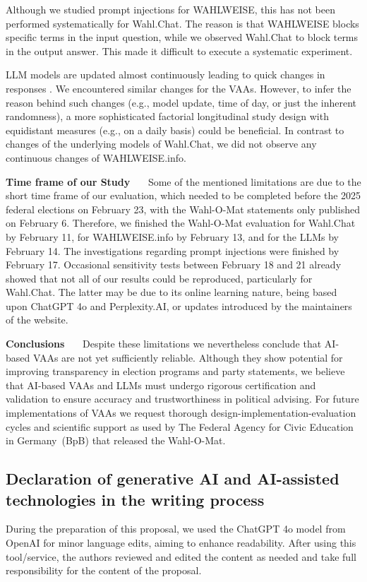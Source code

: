 \documentclass[
	fontsize=10pt,          %
	numbers=noenddot,    	%
    parskip=half,        	%
    listof=totoc,        	%
    bibliography=totoc,  	%
	headsepline=true,       %
	footsepline=false, 		%
    DIV=12                	%
]{scrartcl}
\begin{document}
Although we studied prompt injections for WAHLWEISE, this has not been performed systematically for Wahl.Chat. The reason is that WAHLWEISE blocks specific terms in the input question, while we observed Wahl.Chat to block terms in the output answer. This made it difficult to execute a systematic experiment.

LLM models are updated almost continuously leading to quick changes in responses \citep{lunardi2024elusiveness,liu2025turning}. We encountered similar changes for the VAAs. However, to infer the reason behind such changes (e.g., model update, time of day, or just the inherent randomness), a more sophisticated factorial longitudinal study design with equidistant measures (e.g., on a daily basis) could be beneficial. In contrast to changes of the underlying models of Wahl.Chat, we did not observe any continuous changes of WAHLWEISE.info.

\textbf{Time frame of our Study}~~~
Some of the mentioned limitations are due to the short time frame of our evaluation, which needed to be completed before the 2025 federal elections on February 23, with the Wahl-O-Mat statements only published on February 6. Therefore, we finished the 
Wahl-O-Mat evaluation for Wahl.Chat by February 11, for WAHLWEISE.info
by February 13, and for the LLMs by February 14. The investigations regarding prompt injections were finished by February 17. 
Occasional sensitivity tests between February 18 and 21 already showed that not all of our results could be reproduced, particularly for Wahl.Chat. The latter may be due to its online learning nature, being based upon ChatGPT 4o and Perplexity.AI, or updates introduced by the maintainers of the website. 

%
\textbf{Conclusions}~~~
Despite these limitations we nevertheless conclude that AI-based VAAs are not yet sufficiently reliable. Although they show potential for improving transparency in election programs and party statements, we believe that AI-based VAAs and LLMs must undergo rigorous certification and validation to ensure accuracy and trustworthiness in political advising. For future implementations of VAAs we request thorough design-implementation-evaluation cycles and scientific support as used by The Federal Agency for Civic Education in Germany~(BpB) that released the Wahl-O-Mat.

\subsection*{Declaration of generative AI and AI-assisted technologies in the writing process}
During the preparation of this proposal, we used the ChatGPT 4o model from OpenAI for minor language edits, aiming to enhance readability. After using this tool/service, the authors reviewed and
edited the content as needed and take full responsibility for the content of the proposal.
\end{document}
